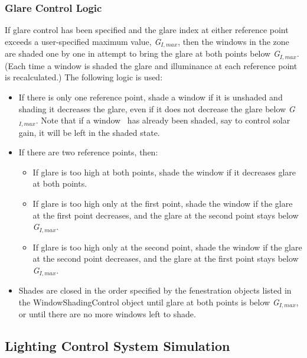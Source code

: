 \subsubsection{Glare Control Logic}\label{glare-control-logic}

If glare control has been specified and the glare index at either reference point exceeds a user-specified maximum value, \emph{G\(_{I,max}\)}, then the windows in the zone are shaded one by one in attempt to bring the glare at both points below \emph{G\(_{I,max}\)}. (Each time a window is shaded the glare and illuminance at each reference point is recalculated.) The following logic is used:

\begin{itemize}
\item
  If there is only one reference point, shade a window if it is unshaded and shading it decreases the glare, even if it does not decrease the glare below \emph{G\(_{I,max}\)}. Note that if a window~ has already been shaded, say to control solar gain, it will be left in the shaded state.

\item
  If there are two reference points, then:

  \begin{itemize}
  \tightlist
  \item
    If glare is too high at both points, shade the window if it decreases glare at both points.
  \item
    If glare is too high only at the first point, shade the window if the glare at the first point decreases, and the glare at the second point stays below \emph{G\(_{I,max}\)}.
  \item
    If glare is too high only at the second point, shade the window if the glare at the second point decreases, and the glare at the first point stays below \emph{G\(_{I,max}\)}.
  \end{itemize}

\item
  Shades are closed in the order specified by the fenestration objects listed in the WindowShadingControl object until glare at both points is below \emph{G\(_{I,max}\)}, or until there are no more windows left to shade.

\end{itemize}

\subsection{Lighting Control System Simulation}\label{lighting-control-system-simulation}

